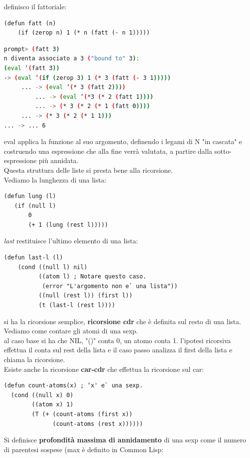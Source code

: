 \documentclass[a4paper,12pt, oneside]{book}
\begin{document}
\newpage
definisco il fattoriale:
\begin{verbatim}
(defun fatt (n)
    (if (zerop n) 1 (* n (fatt (- n 1)))))
\end{verbatim}
\begin{shaded}
	\begin{lstlisting}[language=bash]
prompt> (fatt 3)
n diventa associato a 3 ("bound to" 3):
(eval ‘(fatt 3))
-> (eval ‘(if (zerop 3) 1 (* 3 (fatt (- 3 1)))))
     ... -> (eval ‘(* 3 (fatt 2))))
         ... -> (eval ‘(*3 (* 2 (fatt 1))))
         ... -> (* 3 (* 2 (* 1 (fatt 0))))
     ... -> (* 3 (* 2 (* 1 1)))
... -> ... 6
\end{lstlisting}
\end{shaded}
eval applica la funzione al suo argomento, definendo i legami di N "in cascata" e
costruendo una espressione che alla fine verrà valutata, a partire dalla sotto-espressione
più annidata.\\ Questa struttura delle liste si presta bene alla ricorsione. \\
Vediamo la lunghezza di una lista:
\begin{verbatim}
(defun lung (l)
   (if (null l)
       0
       (+ 1 (lung (rest l)))))
\end{verbatim}
\textit{last} restituisce l'ultimo elemento di una lista:
\begin{verbatim}
(defun last-l (l)
    (cond ((null l) nil)
          ((atom l) ; Notare questo caso.
           (error "L'argomento non e` una lista"))
          ((null (rest l)) (first l))
          (t (last-l (rest l))))
\end{verbatim}
si ha la ricorsione semplice, \textbf{ricorsione cdr} che è definita sul resto di una lista.\\
Vediamo come contare gli atomi di una sexp.\\
al caso base si ha che NIL, "()" conta 0, un atomo conta 1. l'ipotesi ricorsiva effettua il conta sul rest della lista e il caso passo analizza il first della lista e chiama la ricorsione.
\\
Esiste anche la ricorsione \textbf{car-cdr} che effettua la ricorsione sul car:
\begin{verbatim}
(defun count-atoms(x) ; ‘x' e` una sexp.
  (cond ((null x) 0)
        ((atom x) 1)
        (T (+ (count-atoms (first x))
              (count-atoms (rest x))))))
\end{verbatim}
Si definisce \textbf{profondità massima di annidamento} di una sexp come il numero di parentesi sospese (max è definito in Common Lisp:
\end{document}
